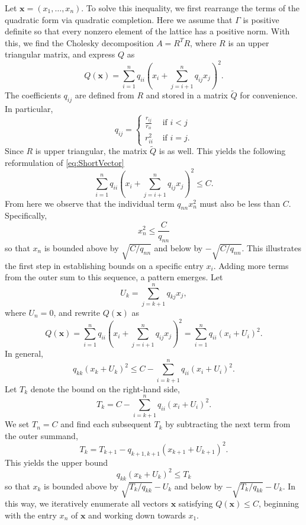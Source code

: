 \documentclass[11pt]{report}
\theoremstyle{definition}
\begin{document}
Let $\mathbf{x} = (x_1, \dots, x_n)$. To solve this inequality, we first rearrange the terms of the quadratic form via quadratic completion. Here we assume that $\Gamma$ is positive definite so that every nonzero element of the lattice has a positive norm. With this, we find the Cholesky decomposition $A = R^TR$, where $R$ is an upper triangular matrix, and express $Q$ as
\[ Q(\mathbf{x}) = \sum_{i=1}^n q_{ii}\left( x_i + \sum_{j=i+1}^n q_{ij}x_j\right)^2.\]
The coefficients $q_{ij}$ are defined from $R$ and stored in a matrix $\tilde{Q}$ for convenience. In particular,
\begin{equation} \label{eq:CholeskyCoeffs}
q_{ij} =
\begin{cases}
\frac{r_{ij}}{r_{ii}} & \text{ if } i < j\\
r_{ii}^2 & \text{ if } i = j.
\end{cases}
\end{equation}
Since $R$ is upper triangular, the matrix $\tilde{Q}$ is as well. This yields the following reformulation of \eqref{eq:ShortVector}
\[ \sum_{i=1}^n q_{ii}\left( x_i + \sum_{j=i+1}^n q_{ij}x_j\right)^2 \leq C.\]
From here we observe that the individual term $q_{nn}x_n^2$ must also be less than $C$. Specifically,
\[x_n^2 \leq \frac{C}{q_{nn}}\]
so that $x_n$ is bounded above by $\sqrt{C/q_{nn}}$ and below by $-\sqrt{C/q_{nn}}$. This illustrates the first step in establishing bounds on a specific entry $x_i$. Adding more terms from the outer sum to this sequence, a pattern emerges. Let
\[U_k = \sum_{j = k+1}^n q_{kj}x_j,\]
where $U_n = 0$, and rewrite $Q(\mathbf{x})$ as
\[Q(\mathbf{x}) = \sum_{i=1}^n q_{ii}\left( x_i + \sum_{j=i+1}^n q_{ij}x_j\right)^2 = \sum_{i=1}^n q_{ii}\left( x_i + U_i\right)^2.\]
In general,
\[q_{kk}(x_k + U_k)^2 \leq C - \sum_{i = k+1}^n q_{ii}(x_i + U_i)^2.\]
Let $T_k$ denote the bound on the right-hand side,
\[T_k = C - \sum_{i = k+1}^n q_{ii}(x_i + U_i)^2.\]
We set $T_n = C$ and find each subsequent $T_k$ by subtracting the next term from the outer summand,
\[T_k = T_{k+1} - q_{k+1,k+1}(x_{k+1} + U_{k+1})^2.\]
This yields the upper bound
\[q_{kk}(x_k + U_k)^2 \leq T_k\]
so that $x_k$ is bounded above by $\sqrt{T_k/q_{kk}} - U_k$ and below by ${-\sqrt{T_k/q_{kk}} - U_k}$. In this way, we iteratively enumerate all vectors $\mathbf{x}$ satisfying $Q(\mathbf{x}) \leq C$, beginning with the entry $x_n$ of $\mathbf{x}$ and working down towards $x_1$.

\end{document}
